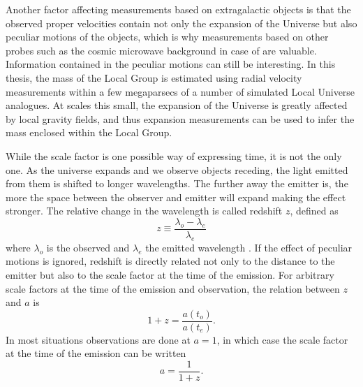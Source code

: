 \documentclass[english, twoside]{HYgradu}
\begin{document}
Another factor affecting measurements based on extragalactic objects is that the observed proper velocities contain not only the expansion of the Universe but also peculiar motions of the objects, which is why measurements based on other probes such as the cosmic microwave background in case of \citet{planck2016resultsI} are valuable. Information contained in the peculiar motions can still be interesting. In this thesis, the mass of the Local Group is estimated using radial velocity measurements within a few megaparsecs of a number of simulated Local Universe analogues. At scales this small, the expansion of the Universe is greatly affected by local gravity fields, and thus expansion measurements can be used to infer the mass enclosed within the Local Group.

While the scale factor is one possible way of expressing time, it is not the only one. As the universe expands and we observe objects receding, the light emitted from them is shifted to longer wavelengths. The further away the emitter is, the more the space between the observer and emitter will expand making the effect stronger. The relative change in the wavelength is called redshift $z$, defined as
\begin{equation}
z \equiv \frac{\lambda_o - \lambda_e}{\lambda_e}
\end{equation}
where $\lambda_o$ is the observed and $\lambda_e$ the emitted wavelength \citep{mo2010galaxy}. If the effect of peculiar motions is ignored, redshift is directly related not only to the distance to the emitter but also to the scale factor at the time of the emission. For arbitrary scale factors at the time of the emission and observation, the relation between $z$ and $a$ is \citep{mo2010galaxy}
\begin{equation}
1 + z = \frac{a(t_o)}{a(t_e)}.
\end{equation}
In most situations observations are done at $a=1$, in which case the scale factor at the time of the emission can be written
\begin{equation}
a = \frac{1}{1+z}.
\end{equation}
\end{document}
